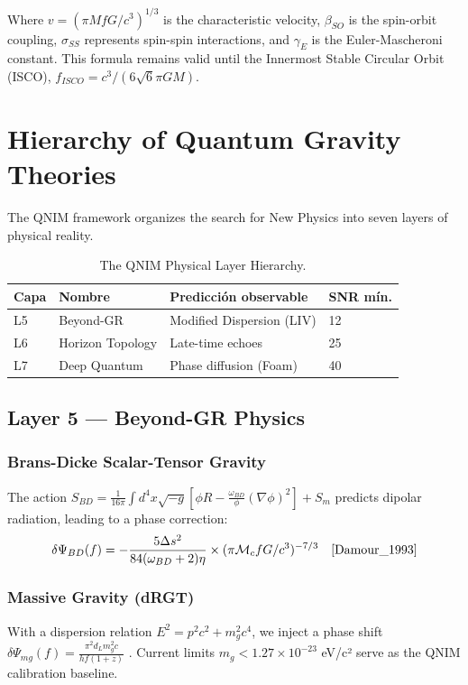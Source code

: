 \documentclass[11pt,a4paper,spanish]{book}
\numberwithin{equation}{chapter}
\numberwithin{figure}{chapter}
\numberwithin{equation}{chapter}
\numberwithin{figure}{chapter}
\numberwithin{table}{chapter}
\begin{document}
Where $v = (\pi M f G / c^3)^{1/3}$ is the characteristic velocity, $\beta_{SO}$ is the spin-orbit coupling, $\sigma_{SS}$ represents spin-spin interactions, and $\gamma_E$ is the Euler-Mascheroni constant. This formula remains valid until the Innermost Stable Circular Orbit (ISCO), $f_{ISCO} = c^3 / (6\sqrt{6} \pi G M)$.

\section{Hierarchy of Quantum Gravity Theories}

The QNIM framework organizes the search for New Physics into seven layers of physical reality.

\begin{table}[h]
\centering
\caption{The QNIM Physical Layer Hierarchy.}
\begin{tabular}{@{}llll@{}}
\toprule
\textbf{Capa} & \textbf{Nombre} & \textbf{Predicción observable} & \textbf{SNR mín.} \\ \midrule
L5 & Beyond-GR & Modified Dispersion (LIV) & 12 \\
L6 & Horizon Topology & Late-time echoes & 25 \\
L7 & Deep Quantum & Phase diffusion (Foam) & 40 \\ \bottomrule
\end{tabular}
\end{table}

\subsection{Layer 5 — Beyond-GR Physics}

\subsubsection{Brans-Dicke Scalar-Tensor Gravity}
The action $S_{BD} = \frac{1}{16\pi}\int d^4x\sqrt{-g}[\phi R - \frac{\omega_{BD}}{\phi}(\nabla\phi)^2] + S_{m}$ predicts dipolar radiation, leading to a phase correction:
\begin{equation}
\delta\Psi_{BD}(f) = -\frac{5\Delta s^2}{84(\omega_{BD}+2)\eta} \times (\pi \mathcal{M}_c f G/c^3)^{-7/3} \quad \text{\cite{Damour_1993}}
\end{equation}

\subsubsection{Massive Gravity (dRGT)}
With a dispersion relation $E^2 = p^2c^2 + m_g^2c^4$, we inject a phase shift $\delta\Psi_{mg}(f) = \frac{\pi^2 d_L m_g^2 c}{h f (1+z)}$ \cite{Will_1998}. Current limits $m_g < 1.27\times10^{-23}$ eV/c² serve as the QNIM calibration baseline.
\end{document}
